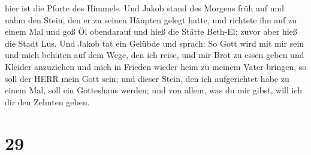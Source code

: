 hier ist die Pforte des Himmels.  Und Jakob stand des
Morgens früh auf und nahm den Stein, den er zu seinen Häupten gelegt
hatte, und richtete ihn auf zu einem Mal und goß Öl obendarauf
 und hieß die Stätte Beth-El; zuvor aber hieß die Stadt
Lus.  Und Jakob tat ein Gelübde und sprach: So Gott wird
mit mir sein und mich behüten auf dem Wege, den ich reise, und mir Brot
zu essen geben und Kleider anzuziehen  und mich in Frieden
wieder heim zu meinem Vater bringen, so soll der HERR mein Gott sein;
 und dieser Stein, den ich aufgerichtet habe zu einem Mal,
soll ein Gotteshaus werden; und von allem, was du mir gibst, will ich
dir den Zehnten geben.

\hypertarget{section-28}{%
\section{29}\label{section-28}}

